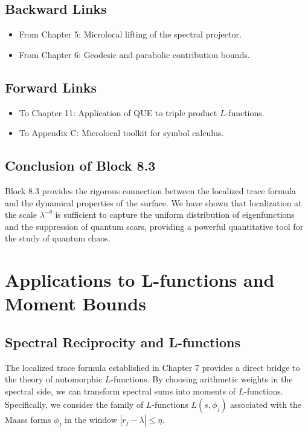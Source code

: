 \subsection*{Backward Links}
\begin{itemize}
    \item From Chapter 5: Microlocal lifting of the spectral projector.
    \item From Chapter 6: Geodesic and parabolic contribution bounds.
\end{itemize}

\subsection*{Forward Links}
\begin{itemize}
    \item To Chapter 11: Application of QUE to triple product $L$-functions.
    \item To Appendix C: Microlocal toolkit for symbol calculus.
\end{itemize}

\subsection*{Conclusion of Block 8.3}
Block 8.3 provides the rigorous connection between the localized trace formula and the dynamical properties of the surface. We have shown that localization at the scale $\lambda^{-\theta}$ is sufficient to capture the uniform distribution of eigenfunctions and the suppression of quantum scars, providing a powerful quantitative tool for the study of quantum chaos.


\section{Applications to L-functions and Moment Bounds}\label{sec:lfunctions}

\subsection{Spectral Reciprocity and L-functions}

The localized trace formula established in Chapter 7 provides a direct bridge to the theory of automorphic $L$-functions. By choosing arithmetic weights in the spectral side, we can transform spectral sums into moments of $L$-functions. Specifically, we consider the family of $L$-functions $L(s, \phi_j)$ associated with the Maass forms $\phi_j$ in the window $|r_j - \lambda| \le \eta$.

